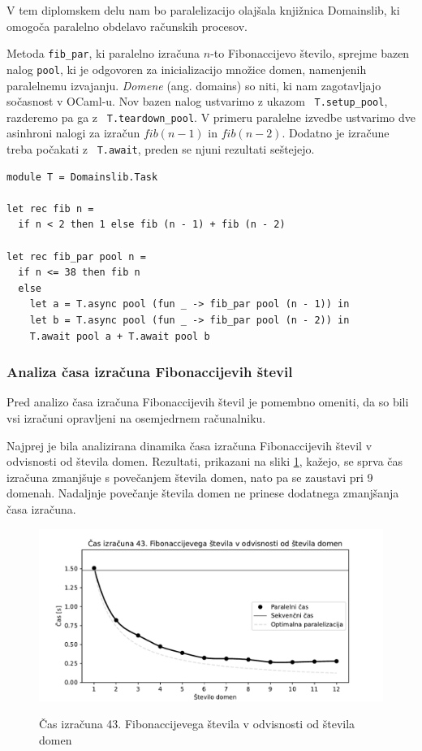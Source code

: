 \documentclass[mat1, tisk]{fmfdelo}
\begin{document}
V tem diplomskem delu nam bo paralelizacijo olajšala knjižnica Domainslib, ki omogoča paralelno obdelavo računskih procesov.

Metoda \texttt{fib\_par}, ki paralelno izračuna $n$-to Fibonaccijevo število, sprejme bazen nalog \texttt{pool},
ki je odgovoren za inicializacijo množice domen, namenjenih paralelnemu izvajanju.
\emph{Domene} (ang. domains) so niti, ki nam zagotavljajo sočasnost v OCaml-u.
Nov bazen nalog ustvarimo z ukazom ~\texttt{T.setup\_pool}, razderemo pa ga z ~\texttt{T.teardown\_pool}.
V primeru paralelne izvedbe ustvarimo dve asinhroni nalogi za izračun $fib(n-1)$ in $fib(n-2)$.
Dodatno je izračune treba počakati z ~\texttt{T.await}, preden se njuni rezultati seštejejo.

\begin{lstlisting}
module T = Domainslib.Task

let rec fib n = 
  if n < 2 then 1 else fib (n - 1) + fib (n - 2)

let rec fib_par pool n =
  if n <= 38 then fib n
  else
    let a = T.async pool (fun _ -> fib_par pool (n - 1)) in
    let b = T.async pool (fun _ -> fib_par pool (n - 2)) in
    T.await pool a + T.await pool b
\end{lstlisting}

\subsubsection{Analiza časa izračuna Fibonaccijevih števil}

Pred analizo časa izračuna Fibonaccijevih števil je pomembno omeniti, da so bili vsi izračuni opravljeni na
osemjedrnem računalniku.

Najprej je bila analizirana dinamika časa izračuna Fibonaccijevih števil v odvisnosti od števila domen. 
Rezultati, prikazani na sliki \ref{fig:fib_par_v_odvisnosti_od_domen}, kažejo, se sprva čas izračuna zmanjšuje
s povečanjem števila domen, nato pa se zaustavi pri 9 domenah. Nadaljnje povečanje števila domen ne prinese
dodatnega zmanjšanja časa izračuna. 
\begin{figure}[h!]
\centering
\caption{Čas izračuna 43. Fibonaccijevega števila v odvisnosti od števila domen}
\includegraphics[width=13cm]{slike/fib_par_v_odvisnosti_od_domen.pdf}
\label{fig:fib_par_v_odvisnosti_od_domen}
\end{figure}
\end{document}
